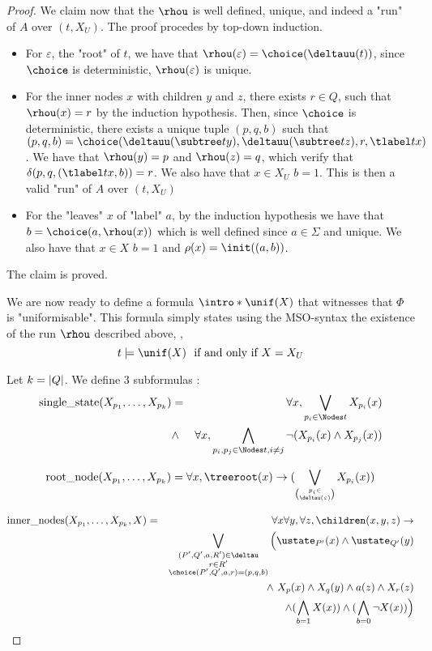 \documentclass{article}
\begin{document}
\begin{proof}
	We claim now that the $\rhou$ is well defined, unique, and indeed a "run" of $A$ over $(t,X_U)$. The proof procedes by top-down induction.
	\begin{itemize}
		\item For $\varepsilon$, the "root" of $t$, we have that $\rhou(\varepsilon) = \choice(\deltauu(t))$, since $\choice$ is deterministic, $\rhou(\varepsilon)$ is unique.
		\item For the inner nodes $x$ with children $y$ and $z$, there exists $r \in Q$, such that $\rhou (x) = r$ by the induction hypothesis. Then,
		      since $\choice$ is deterministic, there exists a unique tuple $(p,q,b)$ such that $(p,q,b) = \choice(\deltauu(\subtree t y), \deltauu(\subtree t z), r, \tlabel t x)$.
		      We have that $\rhou(y) = p$ and $\rhou(z) = q$, which verify that $\delta(p,q,(\tlabel t x,b)) = r$. We also have that $x \in X_U$ \tiff $b = 1$. This is then a valid "run"
		      of $A$ over $(t,X_U)$
		\item For the "leaves" $x$ of "label" $a$, by the induction hypothesis we have that $b = \choice(a, \rhou(x))$ which is well defined since $a \in \Sigma$ and unique.
		      We also have that $x \in X$ \tiff $b = 1$ and $\rho(x) = \init ((a,b))$.
	\end{itemize}
	The claim is proved.

	We are now ready to define a formula $\intro*\unif (X)$ that witnesses that $\Phi$ is "uniformisable".
	This formula simply states using the MSO-syntax the existence of the run $\rhou$ described above, \ie,
	\[  t \models \unif(X) \text{ \tiff } X=X_U \]

	Let $k = \left|Q\right|$.
	We define 3 subformulas :
	\begin{eqnarray*}
		\text{single\_state} (X_{p_1}, \ldots, X_{p_k})  &=& \forall x, \bigvee_{p_i \in \Nodes t} X_{p_i} (x)\\
		&\land& \forall x, \bigwedge_{p_i, p_j \in \Nodes t, i \neq j} \lnot(X_{p_i} (x) \land X_{p_j}(x))
	\end{eqnarray*}

	\begin{equation*}
		\text{root\_node} (X_{p_1}, \ldots, X_{p_k})  = \forall x, \treeroot(x) \ra (\bigvee_{p_i \in \choose \deltau(\varepsilon)} X_{p_i}(x))
	\end{equation*}



	\begin{eqnarray*}
		\text{inner\_nodes} (X_{p_1}, \ldots, X_{p_k}, X)  &=& \forall x \forall y, \forall z, \children (x,y,z) \ra \\
		&& \bigvee_{ \substack{(P',Q',a,R')\in \deltau   \\ r \in R' \\ \choice(P',Q',a,r) = (p,q,b)}} \Big( \ustate_{P'}(x) \land \ustate_{Q'}(y) \\
		&& \qquad \land \  X_p(x) \land X_q(y) \land a(z) \land X_r(z) \\
		&& \qquad \land (\bigwedge_{b = 1}  X(x)) \land (\bigwedge_{b = 0}  \lnot X(x)) \Big)
	\end{eqnarray*}


\end{proof}
\end{document}
